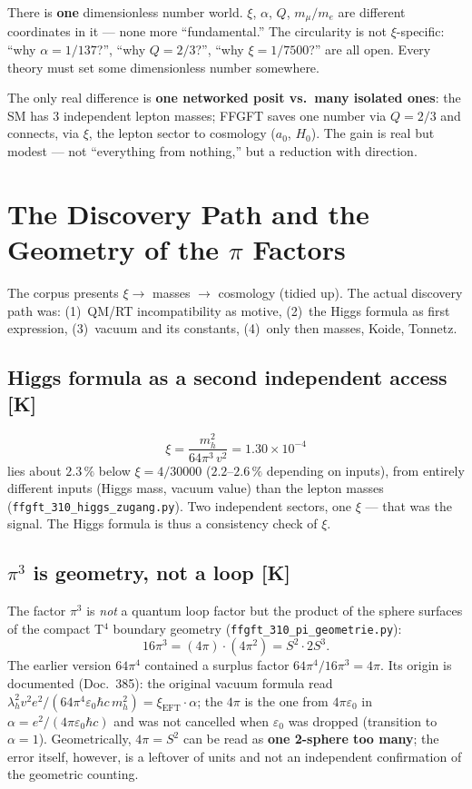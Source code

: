 There is \textbf{one} dimensionless number world. $\xi$, $\alpha$, $Q$,
$m_\mu/m_e$ are different coordinates in it — none more ``fundamental.''
The circularity is not $\xi$-specific: ``why $\alpha = 1/137$?'', ``why
$Q = 2/3$?'', ``why $\xi = 1/7500$?'' are all open. Every theory must set
some dimensionless number somewhere.

The only real difference is \textbf{one networked posit vs.\ many
isolated ones}: the SM has 3 independent lepton masses; FFGFT saves one
number via $Q = 2/3$ and connects, via $\xi$, the lepton sector to
cosmology ($a_0$, $H_0$). The gain is real but modest — not ``everything
from nothing,'' but a reduction with direction.

\chapter{The Discovery Path and the Geometry of the \texorpdfstring{$\pi$}{pi} Factors}

The corpus presents $\xi \to$ masses $\to$ cosmology (tidied up). The
actual discovery path was: (1)~QM/RT incompatibility as motive, (2)~the
Higgs formula as first expression, (3)~vacuum and its constants,
(4)~only then masses, Koide, Tonnetz.

\section{Higgs formula as a second independent access [K]}

\[
  \xi = \frac{m_h^2}{64\pi^3\, v^2} = 1.30 \times 10^{-4}
\]
lies about $2.3\,\%$ below $\xi = 4/30000$ ($2.2$--$2.6\,\%$ depending
on inputs), from entirely different inputs (Higgs
mass, vacuum value) than the lepton masses
(\texttt{ffgft\_310\_higgs\_zugang.py}). Two independent sectors, one
$\xi$ — that was the signal. The Higgs formula is thus a consistency
check of $\xi$.

\section{$\pi^3$ is geometry, not a loop [K]}

The factor $\pi^3$ is \emph{not} a quantum loop factor but the product
of the sphere surfaces of the compact T$^4$ boundary geometry
(\texttt{ffgft\_310\_pi\_geometrie.py}):
\[
  16\pi^3 = (4\pi)\cdot(4\pi^2) = S^2 \cdot 2S^3.
\]
The earlier version $64\pi^4$ contained a surplus factor
$64\pi^4 / 16\pi^3 = 4\pi$. Its origin is documented (Doc.~385): the
original vacuum formula read
$\lambda_h^2 v^2 e^2/(64\pi^4\varepsilon_0\hbar c\, m_h^2) = \xi_{\text{EFT}}\cdot\alpha$;
the $4\pi$ is the one from $4\pi\varepsilon_0$ in
$\alpha = e^2/(4\pi\varepsilon_0\hbar c)$ and was not cancelled when
$\varepsilon_0$ was dropped (transition to $\alpha = 1$). Geometrically,
$4\pi = S^2$ can be read as \textbf{one 2-sphere too many}; the error
itself, however, is a leftover of units and not an independent
confirmation of the geometric counting.

